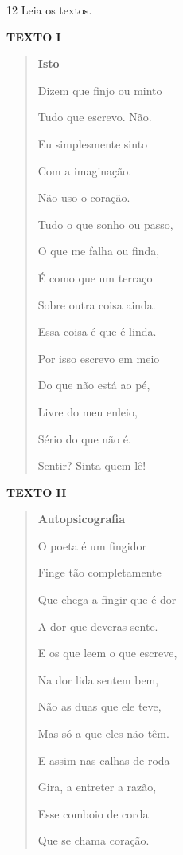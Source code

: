 \num{12} Leia os textos.

\textbf{TEXTO I}

\begin{quote}

\textbf{Isto}

Dizem que finjo ou minto

Tudo que escrevo. Não.

Eu simplesmente sinto

Com a imaginação.

Não uso o coração.

Tudo o que sonho ou passo,

O que me falha ou finda,

É como que um terraço

Sobre outra coisa ainda.

Essa coisa é que é linda.

Por isso escrevo em meio

Do que não está ao pé,

Livre do meu enleio,

Sério do que não é.

Sentir? Sinta quem lê!
\end{quote}



\textbf{TEXTO II}

\begin{quote}
\textbf{Autopsicografia}

O poeta é um fingidor

Finge tão completamente

Que chega a fingir que é dor

A dor que deveras sente.

E os que leem o que escreve,

Na dor lida sentem bem,

Não as duas que ele teve,

Mas só a que eles não têm.

E assim nas calhas de roda

Gira, a entreter a razão,

Esse comboio de corda

Que se chama coração.
\end{quote}


